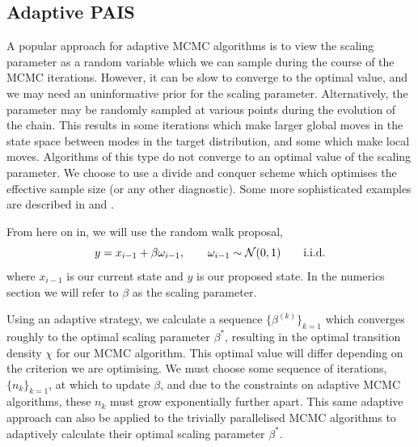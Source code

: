\documentclass[final]{siamltex}
\begin{document}
\subsection{Adaptive PAIS}\label{sec:adapt}

A popular approach for adaptive MCMC algorithms is to view the scaling
parameter as a random variable which we can sample during the course
of the MCMC iterations. However, it can be slow to converge to the
optimal value, and we may need an
uninformative prior for the scaling parameter. Alternatively, the
parameter may be randomly sampled at various points during the
evolution of the chain. This results in some iterations which make
larger global moves in the state space between modes in the target
distribution, and some which make local moves. Algorithms of this type
do not converge to an optimal value of the scaling parameter. We choose to use a divide and conquer scheme which optimises the
effective sample size (or any other diagnostic). Some more
sophisticated examples are described in \cite{roberts2009examples} and
\cite{Ji2013adaptive}. 

From here on in, we will use the random walk proposal,
\begin{equation}y = x_{i-1}+\beta \omega_{i-1}, \qquad \omega_{i-1}
  \sim \mathcal{N}(0,1) \qquad {\rm i.i.d.}
\end{equation}
where $x_{i-1}$ is our current state and $y$ is our proposed state. In the numerics section we will refer to $\beta$ as the scaling parameter.

 Using an adaptive strategy, we calculate a sequence
 $\{\beta^{(k)}\}_{k=1}$ which converges roughly to the optimal
 scaling parameter $\beta^*$, resulting in the optimal transition
 density $\chi$ for our MCMC algorithm. This optimal value will differ
 depending on the criterion we are optimising. We must choose some sequence
 of iterations, $\{n_k\}_{k=1}$, at which to update $\beta$, and due
 to the constraints on adaptive MCMC
 algorithms\cite{roberts2007coupling,roberts2009examples}, these $n_k$
 must grow exponentially further apart. This same adaptive approach
 can also be applied to the trivially parallelised MCMC algorithms to adaptively calculate their optimal scaling parameter $\beta^*$.
\end{document}
